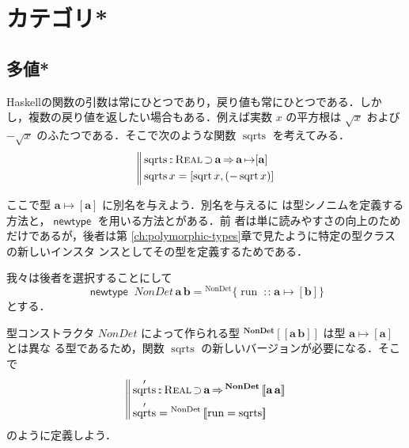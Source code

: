 \documentclass[a5paper,twoside,fleqn,draft]{jsbook}
\def\[{\left[\!\left[}
\def\]{\right]\!\right]}
\newcommand{\programminglanguage}[1]{\textsf{#1}}
\newcommand{\haskell}{\programminglanguage{Haskell}}
\newcommand{\mBrace}{\Vert}
\newcommand{\mKeyword}[1]{\mathsf{#1}} %
\newcommand{\mKeywordUnderline}[1]{\text{\underline{\textsf{#1}}}} %
\newcommand{\mNewDataTypeKeyword}{\mKeyword{newtype}}
\newcommand{\mTypeSynonymKeyword}{\mKeywordUnderline{type}\mKeyword{synonym}}
\DeclareMathOperator{\mNewDataType}{\mNewDataTypeKeyword}
\DeclareMathOperator{\mSuperClass}{\Rightarrow}
\DeclareMathOperator{\mSuperSet}{\supset}
\DeclareMathOperator{\mTypeSynonym}{\mTypeSynonymKeyword}
\newcommand{\mSpecialFunc}[1]{\mathrm{#1}}
\DeclareMathOperator{\mRun}{\mSpecialFunc{run}}
\DeclareMathOperator{\mSqrt}{\mSpecialFunc{sqrt}}
\DeclareMathOperator{\mSqrts}{\mSpecialFunc{sqrts}}
\DeclareMathOperator{\mIn}{{:\!:}}
\DeclareMathOperator{\mMapsTo}{\mapsto}
\newcommand{\mType}[1]{\mathbf{#1}}
\newcommand{\mA}{\mType{a}}
\newcommand{\mB}{\mType{b}}
\newcommand{\mListType}[1]{[\mType{#1}]}
\newcommand{\mGenericTypeAssemble}[2]{{}^{\mType{#1}}\[\mType{#2}\]}
\newcommand{\mTypeConstructor}[1]{\textit{#1}}
\newcommand{\mValueConstructor}[1]{\mathrm{#1}}
\newcommand{\mGenericValueAssemble}[2]{{}^\mValueConstructor{#1}\[#2\]}
\newcommand{\mGenericRecordWith}[2]{{}^\mValueConstructor{#1}\{#2\}}
\newcommand{\mGenericTypeClass}[1]{\textsc{#1}} %
\newcommand{\mRealTypeClass}{\mGenericTypeClass{Real}}
\begin{document}




\chapter{カテゴリ*}

\section{多値*}

\haskell の関数の引数は常にひとつであり，戻り値も常にひとつである．しか
し，複数の戻り値を返したい場合もある．例えば実数 $x$ の平方根は
$\sqrt{x}$ および $-\sqrt{x}$ のふたつである．そこで次のような関数
$\mSqrts$ を考えてみる．
\begin{equation}
  \left\mBrace
  \begin{aligned}
    &\mSqrts\mIn{}\mRealTypeClass\mSuperSet\mType{a}\mSuperClass
    \mA\mMapsTo\mListType{\mA}\\
    &\mSqrts x=[\mSqrt x,(-\mSqrt x)]
  \end{aligned}
  \right.
\end{equation}

ここで型 $\mA\mMapsTo\mListType{\mA}$ に別名を与えよう．別名を与えるに
は型シノニムを定義する方法と，$\mNewDataType$ を用いる方法とがある．前
者は単に読みやすさの向上のためだけであるが，後者は第
\ref{ch:polymorphic-types}章で見たように特定の型クラスの新しいインスタ
ンスとしてその型を定義するためである．

我々は後者を選択することにして
\begin{equation}
  \mNewDataType\;
  \mTypeConstructor{NonDet}\,\mA\,\mB
  =\mGenericRecordWith{NonDet}{\mRun\mIn\mA\mMapsTo[\mB]}
\end{equation}
とする．

型コンストラクタ $\mTypeConstructor{NonDet}$ によって作られる型
$\mGenericTypeAssemble{NonDet}{\mA\,\mB}$ は型 $\mA\mMapsTo[\mA]$ とは異な
る型であるため，関数 $\mSqrts$ の新しいバージョンが必要になる．そこで
\begin{equation}
  \left\mBrace
  \begin{aligned}
    &\mSqrts'\mIn\mRealTypeClass\mSuperSet\mType{a}\mSuperClass
    \mGenericTypeAssemble{NonDet}{\mA\,\mA}\\
    &\mSqrts'=\mGenericValueAssemble{NonDet}{\mRun=\mSqrts}
  \end{aligned}
  \right.
\end{equation}
のように定義しよう．
\end{document}
